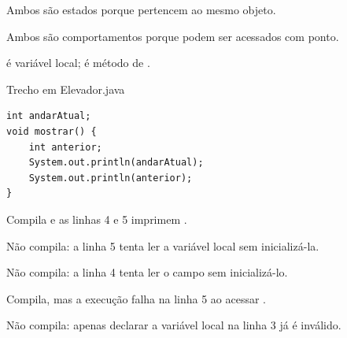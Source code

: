 \documentclass[11pt,a4paper]{article}
\begin{document}
\begin{minipage}[t]{.485\textwidth}
\begin{alternativas}
\item Ambos são estados porque pertencem ao mesmo objeto.
\item Ambos são comportamentos porque podem ser acessados com ponto.
\item {} é variável local;  é método de .
\end{alternativas}
\begin{alternativas}
\item {}
\item {}
\item {}
\item {}
\item {}
\end{alternativas}
\begin{painelEvolucao}{Trecho em Elevador.java}
\begin{lstlisting}[style=questaocodigo]
int andarAtual;
void mostrar() {
    int anterior;
    System.out.println(andarAtual);
    System.out.println(anterior);
}
\end{lstlisting}
\end{painelEvolucao}
\begin{alternativas}
\item Compila e as linhas 4 e 5 imprimem .
\item Não compila: a linha 5 tenta ler a variável local  sem inicializá-la.
\item Não compila: a linha 4 tenta ler o campo  sem inicializá-lo.
\item Compila, mas a execução falha na linha 5 ao acessar .
\item Não compila: apenas declarar a variável local na linha 3 já é inválido.
\end{alternativas}
\end{minipage}\hfill
\end{document}
